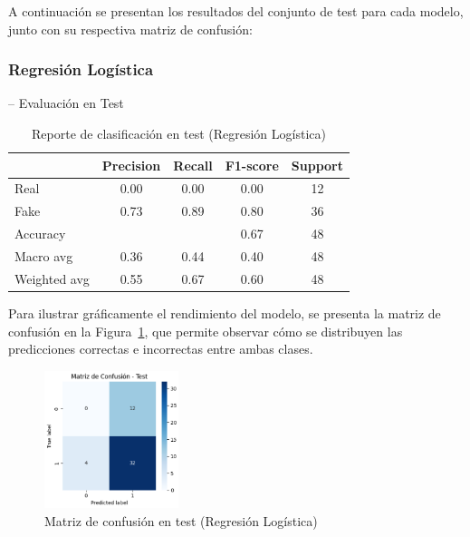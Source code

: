 \documentclass[conference]{IEEEtran}
\begin{document}
A continuación se presentan los resultados del conjunto de test para cada modelo, junto con su respectiva matriz de confusión:


\subsubsection{Regresión Logística } -- Evaluación en Test


\vspace{0.2cm}


    \begin{table}[h]
    \centering
    \caption{Reporte de clasificación en test (Regresión Logística)}
    \begin{tabular}{lcccc}
    \toprule
     & Precision & Recall & F1-score & Support \\
    \midrule
    Real & 0.00 & 0.00 & 0.00 & 12 \\
    Fake & 0.73 & 0.89 & 0.80 & 36 \\
    \midrule
    Accuracy & & & 0.67 & 48 \\
    Macro avg & 0.36 & 0.44 & 0.40 & 48 \\
    Weighted avg & 0.55 & 0.67 & 0.60 & 48 \\
    \bottomrule
    \end{tabular}
    \label{tab:logistic_test}
    \end{table}

\vspace{0.2cm}

Para ilustrar gráficamente el rendimiento del modelo, se presenta la matriz de confusión en la Figura~\ref{fig:cm_test}, que permite observar cómo se distribuyen las predicciones correctas e incorrectas entre ambas clases.

\begin{figure}[htbp]
\centering
\includegraphics[width=0.35\textwidth]{images/cm_test.png}
\caption{Matriz de confusión en test (Regresión Logística)}
\label{fig:cm_test}
\end{figure}
\end{document}
